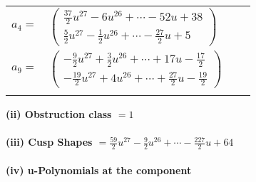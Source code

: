 \documentclass[1p]{elsarticle_modified}
\theoremstyle{definition}
\begin{document}
\begin{tabular}{m{7pt} m{180pt} m{7pt} m{180pt} }
\flushright $a_{4}=$&$\begin{pmatrix}\frac{37}{2} u^{27}-6 u^{26}+\cdots-52 u+38\\\frac{5}{2} u^{27}-\frac{1}{2} u^{26}+\cdots-\frac{27}{2} u+5\end{pmatrix}$ \\
\flushright $a_{9}=$&$\begin{pmatrix}-\frac{9}{2} u^{27}+\frac{3}{2} u^{26}+\cdots+17 u-\frac{17}{2}\\-\frac{19}{2} u^{27}+4 u^{26}+\cdots+\frac{27}{2} u-\frac{19}{2}\end{pmatrix}$\\&\end{tabular}
\flushleft \textbf{(ii) Obstruction class $= 1$}\\~\\
\flushleft \textbf{(iii) Cusp Shapes $= \frac{59}{2} u^{27}-\frac{9}{2} u^{26}+\cdots-\frac{227}{2} u+64$}\\~\\
\newpage\renewcommand{\arraystretch}{1}
\flushleft \textbf{(iv) u-Polynomials at the component}\newline \\
\end{document}
